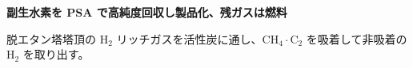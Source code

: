 \begin{frame}

  {\bfseries\large 副生水素を PSA で高純度回収し製品化、残ガスは燃料}\par
  \vspace{0.15em}
  {\footnotesize 脱エタン塔塔頂の $\mathrm{H_2}$ リッチガスを活性炭に通し、$\mathrm{CH_4}\cdot\mathrm{C_2}$ を吸着して非吸着の $\mathrm{H_2}$ を取り出す。}\par

  \vspace{0.5em}


\end{frame}
